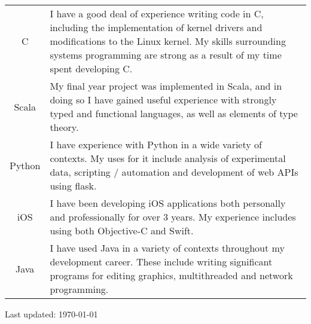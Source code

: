 \documentclass[letterpaper]{article}
\def\footerlink{}
\begin{document}
	\begin{center}
		\renewcommand{\arraystretch}{2}
		\begin{tabular}{cp{10cm}}
            C & I have a good deal of experience writing code in C, including
            the implementation of kernel drivers and modifications to the Linux
            kernel. My skills surrounding systems programming are strong as a
            result of my time spent developing C. \\

            Scala & My final year project was implemented in Scala, and in doing
            so I have gained useful experience with strongly typed and
            functional languages, as well as elements of type theory. \\

            Python & I have experience with Python in a wide variety of
            contexts. My uses for it include analysis of experimental data,
            scripting / automation and development of web APIs using flask. \\

            iOS & I have been developing iOS applications both personally and
            professionally for over 3 years. My experience includes using both
            Objective-C and Swift. \\

            Java & I have used Java in a variety of contexts throughout my
            development career. These include writing significant programs for
            editing graphics, multithreaded and network programming.
        \end{tabular}
\end{center}

\bigskip

\begin{center}
  \begin{footnotesize}
    Last updated: \today \\
    \href{\footerlink}{\texttt{\footerlink}}
  \end{footnotesize}
\end{center}
\end{document}
